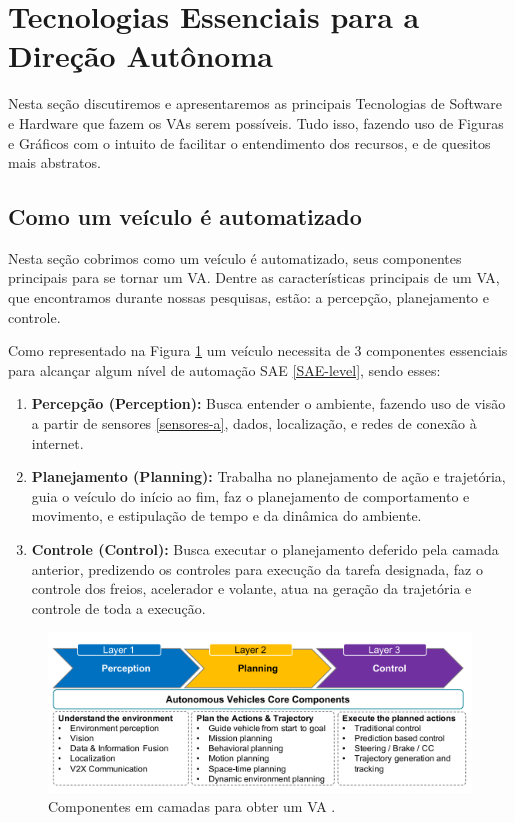 \section{Tecnologias Essenciais para a Direção Autônoma} \label{essencias_di}

Nesta seção discutiremos e apresentaremos as principais Tecnologias de Software e Hardware que fazem os VAs serem possíveis. Tudo isso, fazendo uso de Figuras e Gráficos com o intuito de facilitar o entendimento dos recursos, e de quesitos mais abstratos. 


\subsection{Como um veículo é automatizado} \label{auto}
Nesta seção cobrimos como um veículo é automatizado, seus componentes principais para se tornar um VA. Dentre as características principais de um VA, que encontramos durante nossas pesquisas, estão: a percepção, planejamento e controle.

Como representado na Figura \ref{figura_perception} um veículo necessita de 3 componentes essenciais para alcançar algum nível de automação SAE \ref{SAE-level}, sendo esses:


\begin{enumerate}
 \item \textbf{Percepção (Perception):} Busca entender o ambiente, fazendo uso de visão a partir de sensores \ref{sensores-a}, dados, localização, e redes de conexão à internet.
\item \textbf{Planejamento (Planning):} Trabalha no planejamento de ação e trajetória, guia o veículo do início ao fim, faz o planejamento de comportamento e movimento, e estipulação de tempo e da dinâmica do ambiente.
\item \textbf{Controle (Control):} Busca executar o planejamento deferido pela camada anterior, predizendo os controles para execução da tarefa designada, faz o controle dos freios, acelerador e volante, atua na geração da trajetória e controle de toda a execução.

\end{enumerate}

\begin{figure}[H]
\centering
\includegraphics[width=\textwidth]{Figures/perception.png}
\caption{Componentes em camadas para obter um VA \cite{sensors-yet}.}
\label{figura_perception}
\end{figure}


